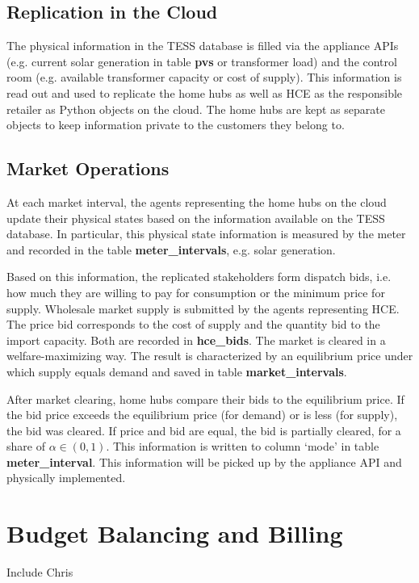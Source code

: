\subsection{Replication in the Cloud}

The physical information in the TESS database is filled via the appliance APIs (e.g. current solar generation in table \textbf{pvs} or transformer load) and the control room (e.g. available transformer capacity or cost of supply). This information is read out and used to replicate the home hubs as well as HCE as the responsible retailer as Python objects on the cloud. The home hubs are kept as separate objects to keep information private to the customers they belong to.

\subsection{Market Operations}

At each market interval, the agents representing the home hubs on the cloud update their physical states based on the information available on the TESS database. In particular, this physical state information is measured by the meter and recorded in the table \textbf{meter\_intervals}, e.g. solar generation. 

Based on this information, the replicated stakeholders form dispatch bids, i.e. how much they are willing to pay for consumption or the minimum price for supply. Wholesale market supply is submitted by the agents representing HCE. The price bid corresponds to the cost of supply and the quantity bid to the import capacity. Both are recorded in \textbf{hce\_bids}. The market is cleared in a welfare-maximizing way. The result is characterized by an equilibrium price under which supply equals demand and saved in table \textbf{market\_intervals}.

After market clearing, home hubs compare their bids to the equilibrium price. If the bid price exceeds the equilibrium price (for demand) or is less (for supply), the bid was cleared. If price and bid are equal, the bid is partially cleared, for a share of $\alpha \in (0,1)$. This information is written to column `mode' in table \textbf{meter\_interval}. This information will be picked up by the appliance API and physically implemented.

\section{Budget Balancing and Billing}

Include Chris